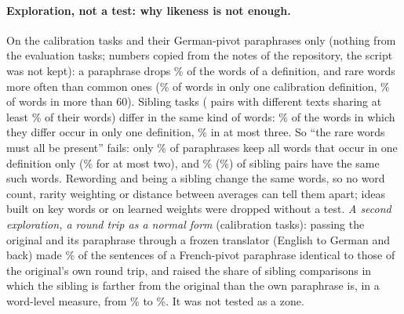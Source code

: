 \paragraph{Exploration, not a test: why likeness is not enough.} On the \WidenTasksCal{} calibration tasks and their German-pivot paraphrases only (nothing from the evaluation tasks; numbers copied from the notes of the repository, the script was not kept): a paraphrase drops \WidenExploreDropShare{}\% of the words of a definition, and rare words more often than common ones (\WidenExploreDropRare{}\% of words in only one calibration definition, \WidenExploreDropCommon{}\% of words in more than 60). Sibling tasks (\WidenExploreSiblingPairs{} pairs with different texts sharing at least \WidenExploreSiblingSharedMin{}\% of their words) differ in the same kind of words: \WidenExploreSiblingRare{}\% of the words in which they differ occur in only one definition, \WidenExploreSiblingFew{}\% in at most three. So ``the rare words must all be present'' fails: only \WidenExploreKeepAllOne{}\% of paraphrases keep all words that occur in one definition only (\WidenExploreKeepAllTwo{}\% for at most two), and \WidenExploreSiblingSameOne{}\% (\WidenExploreSiblingSameTwo{}\%) of sibling pairs have the same such words. Rewording and being a sibling change the same words, so no word count, rarity weighting or distance between averages can tell them apart; ideas built on key words or on learned weights were dropped without a test.
\emph{A second exploration, a round trip as a normal form} (calibration tasks): passing the original and its paraphrase through a frozen translator (English to German and back) made \WidenExploreRoundTripIdentical{}\% of the sentences of a French-pivot paraphrase identical to those of the original's own round trip, and raised the share of sibling comparisons in which the sibling is farther from the original than the own paraphrase is, in a word-level measure, from \WidenExploreRoundTripFarFrom{}\% to \WidenExploreRoundTripFarTo{}\%. It was not tested as a zone.

